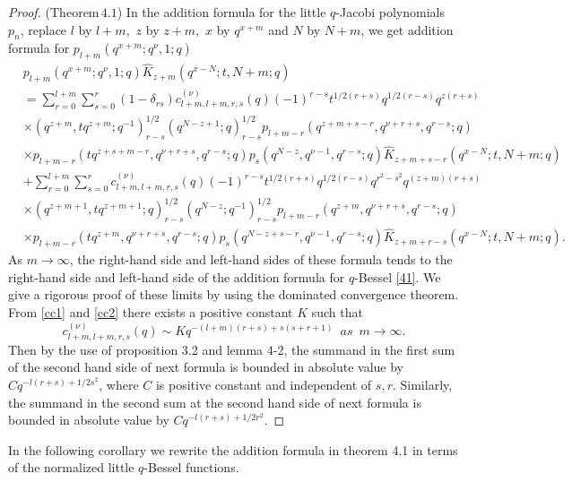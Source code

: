 \documentclass[12pt,a4paper]{amsart}
\numberwithin{equation}{section}
\theoremstyle{plain}
\theoremstyle{definition}
\theoremstyle{remark}
\numberwithin{equation}{section}
\numberwithin{table}{section}
\numberwithin{figure}{section}
\begin{document}
\begin{proof}($\mathrm{Theorem \,4.1}$)
In the addition formula for the little $q$-Jacobi polynomials $p_n$,
replace $l$ by $l+m,$ $z$ by $z+m,$ $x$ by $q^{x+m}$ and $N$ by
$N+m$, we get addition formula for $p_{l+m}(q^{x+m};q^{\nu},1;q)$
\begin{align*}
&p_{l+m}(q^{x+m};q^{\nu},1;q)\widehat{K}_{z+m}(q^{x-N};t,N+m;q)\\&=\sum_{r=0}^{l+m}\sum_{s=0}^{r}(1-\delta_{rs})c_{l+m,l+m,r,s}^{(\nu)}(q)
(-1)^{r-s}t^{1/2(r+s)}q^{1/2(r-s)}q^{z(r+s)}\\&
 \times
(q^{z+m},tq^{z+m};q^{-1})_{r-s}^{1/2}
(q^{N-z+1};q)_{r-s}^{1/2}
p_{l+m-r}(q^{z+m+s-r},q^{\nu+r+s},q^{r-s};q)\\&
 \times
p_{l+m-r}(tq^{z+s+m-r},q^{\nu+r+s},q^{r-s};q)
p_{s}(q^{N-z},q^{\nu-1},q^{r-s};q)\widehat{K}_{z+m+s-r}(q^{x-N};t,N+m;q)\\&+\sum_{r=0}^{l+m}\sum_{s=0}^{r}c_{l+m,l+m,r,s}^{(\nu)}(q)
(-1)^{r-s}t^{1/2(r+s)}q^{1/2(r-s)}q^{r^2-s^2}q^{(z+m)(r+s)}\\&
\times(q^{z+m+1},tq^{z+m+1};q)_{r-s}^{1/2}
(q^{N-z};q^{-1})_{r-s}^{1/2}
p_{l+m-r}(q^{z+m},q^{\nu+r+s},q^{r-s};q) \\&
\times p_{l+m-r}(tq^{z+m},q^{\nu+r+s},q^{r-s};q)
p_{s}(q^{N-z+s-r},q^{\nu-1},q^{r-s};q)\widehat{K}_{z+m+r-s}(q^{x-N};t,N+m;q).
\end{align*}
As $m\rightarrow \infty$, the right-hand side and left-hand sides of
these formula tends to the right-hand side and left-hand side of the
addition formula for $q$-Bessel \eqref{41}. We give a rigorous
proof of these limits by using the dominated
convergence theorem.\\
From \eqref{cc1} and \eqref{cc2} there exists a positive constant $K$
such that
\begin{equation}
c_{l+m,l+m,r,s}^{(\nu)}(q)\sim
Kq^{-(l+m)(r+s)+s(s+r+1)}\, \, \, as\,\,\,
m\rightarrow\infty.
\end{equation}
Then by the use of proposition 3.2 and lemma 4-2, the summand in the
first sum of the second hand side of next formula is bounded in
absolute value by $Cq^{-l(r+s)+1/2s^2}$, where $C$ is positive
constant and independent of $s,r$. Similarly, the summand in the
second sum at the second hand side of next formula is bounded in
absolute value by $Cq^{-l(r+s)+1/2r^2}.$
\end{proof}
In the following corollary we rewrite the addition formula in
theorem 4.1 in terms of the normalized little $q$-Bessel functions.
\end{document}
